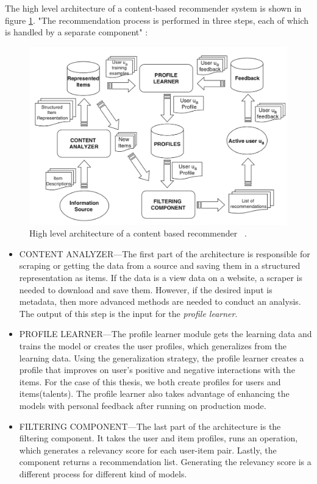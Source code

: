 The high level architecture of a content-based recommender system is shown in figure \ref{fig:high-level-content-based}. "The recommendation process is performed in three steps, each of which is handled by a separate component" \cite{de2015semantics}:

\begin{figure}[htp]
	\centering
	\includegraphics[width=\textwidth]{figures/HighLevelContentBased.png}
	\caption{High level architecture of a content based recommender  ~\parencite{de2015semantics}.}
	\label{fig:high-level-content-based}
\end{figure}



\begin{itemize}
	\item CONTENT ANALYZER—The first part of the architecture is responsible for scraping or getting the data from a source and saving them in a structured representation as items. If the data is a view data on a website, a scraper is needed to download and save them. However, if the desired input is metadata, then more advanced methods are needed to conduct an analysis. The output of this step is the input for the \textit{profile learner}.
	\item PROFILE LEARNER—The profile learner module gets the learning data and trains the model or creates the user profiles, which generalizes from the learning data. Using the generalization strategy, the profile learner creates a profile that improves on user's positive and negative interactions with the items. For the case of this thesis, we both create profiles for users and items(talents). The profile learner also takes advantage of enhancing the models with personal feedback after running on production mode.
	\item FILTERING COMPONENT—The last part of the architecture is the filtering component. It takes the user and item profiles, runs an operation, which generates a relevancy score for each user-item pair. Lastly, the component returns a recommendation list. Generating the relevancy score is a different process for different kind of models.
\end{itemize}

